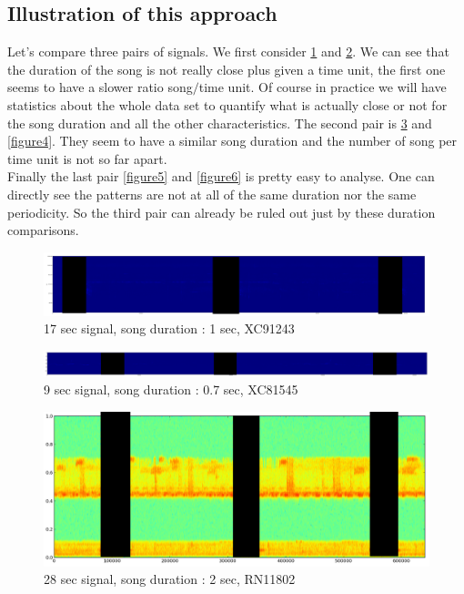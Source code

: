 \documentclass[a4paper]{article}
\begin{document}
\subsection{Illustration of this approach}
Let's compare three pairs of signals. We first consider \ref{figure1} and \ref{figure2}. We can see that the duration of the song is not really close plus given a time unit, the first one seems to have a slower ratio song$/$time unit. Of course in practice we will have statistics about the whole data set to quantify what is actually close or not for the song duration and all the other characteristics. The second pair is \ref{figure3} and \ref{figure4}. They seem to have a similar song duration and the number of song per time unit is not so far apart.
\\
Finally the last pair \ref{figure5} and \ref{figure6} is pretty easy to analyse. One can directly see the patterns are not at all of the same duration nor the same periodicity. So the third pair can already be ruled out just by these duration comparisons.
\begin{figure}[H]
\begin{center}
\includegraphics[scale=0.23]{XC91243_ter.png}\caption{17 sec signal, song duration : 1 sec, XC91243}\label{figure1}
\end{center}
\end{figure}


\begin{figure}[H]
\begin{center}
\includegraphics[scale=0.2]{XC81545_ter.png}\caption{9 sec signal, song duration : 0.7 sec, XC81545}\label{figure2}
\end{center}
\end{figure}


\begin{figure}[H]
\begin{center}
\includegraphics[scale=0.2]{RN11802.png}\caption{28 sec signal, song duration : 2 sec, RN11802}\label{figure3}
\end{center}
\end{figure}
\end{document}
